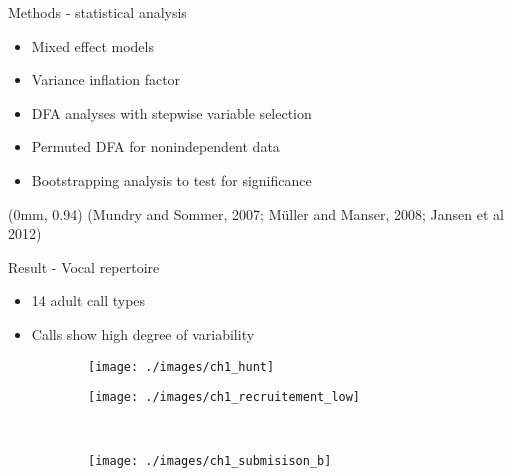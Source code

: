 \documentclass[xcolor=dvipsnames]{beamer}
\newcommand\References[1]{
\tiny{
  \begin{textblock*}{\paperwidth}(0mm, 0.94\paperheight)%
    \raggedleft (#1)\hspace{0.01\paperwidth}
  \end{textblock*}}}
\begin{document}
\begin{frame}{Methods - statistical analysis}
\begin{itemize}
\item Mixed effect models
\item Variance inflation factor
\item DFA analyses with stepwise variable selection
\item Permuted DFA for nonindependent data
\item Bootstrapping analysis to test for significance 
\end{itemize}
\References{Mundry and Sommer, 2007; M\"uller and Manser, 2008; Jansen et al 2012}	
\end{frame}
\begin{frame}{Result - Vocal repertoire}
\begin{itemize}
\item<1> 14 adult call types 
\item<1> Calls show high degree of variability 
\end{itemize}


\end{frame}
\begin{frame}
\begin{figure}
\begin{subfigure}{.45\textwidth}
\centering
\texttt{[image: ./images/ch1\_hunt]} 
\end{subfigure} \quad
\begin{subfigure}{.45\textwidth}
\centering
\texttt{[image: ./images/ch1\_recruitement\_low]} 
\end{subfigure}\

\begin{subfigure}{.45\textwidth}
\centering
\texttt{[image: ./images/ch1\_submisison\_b]} 
\end{subfigure}
\end{figure}
\end{frame}
\end{document}
